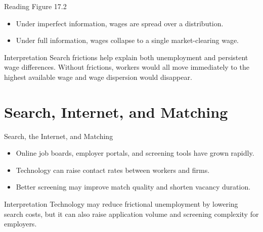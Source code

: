 \documentclass[aspectratio=169]{beamer}
\begin{document}
\begin{frame}{Reading Figure 17.2}
\transfade
\begin{itemize}
  \item Under imperfect information, wages are spread over a distribution.
  \item Under full information, wages collapse to a single market-clearing wage.
\end{itemize}

\begin{block}{Interpretation}
Search frictions help explain both unemployment and persistent wage differences. Without frictions, workers would all move immediately to the highest available wage and wage dispersion would disappear.
\end{block}
\end{frame}

\section{Search, Internet, and Matching}

\begin{frame}{Search, the Internet, and Matching}
\transfade
\begin{itemize}
  \item Online job boards, employer portals, and screening tools have grown rapidly.
  \item Technology can raise contact rates between workers and firms.
  \item Better screening may improve match quality and shorten vacancy duration.
\end{itemize}

\begin{block}{Interpretation}
Technology may reduce frictional unemployment by lowering search costs, but it can also raise application volume and screening complexity for employers.
\end{block}
\end{frame}
\end{document}
